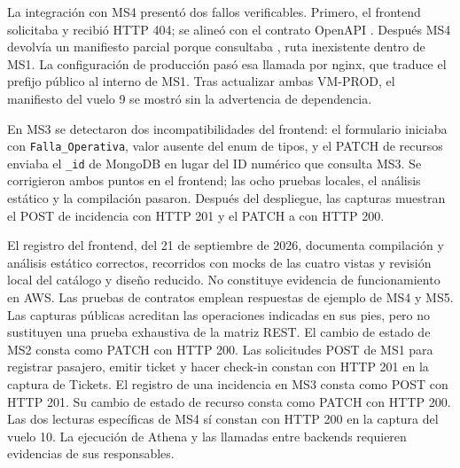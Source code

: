 La integración con MS4 presentó dos fallos verificables. Primero, el frontend
solicitaba  y recibió HTTP 404; se alineó
con el contrato OpenAPI . Después MS4 devolvía un
manifiesto parcial porque consultaba
, ruta inexistente dentro de MS1.
La configuración de producción pasó esa llamada por nginx, que traduce el
prefijo público al interno de MS1. Tras actualizar ambas VM-PROD, el
manifiesto del vuelo 9 se mostró sin la advertencia de dependencia.

En MS3 se detectaron dos incompatibilidades del frontend: el formulario
iniciaba con \texttt{Falla\_Operativa}, valor ausente del enum de tipos, y
el PATCH de recursos enviaba el \texttt{\_id} de MongoDB en lugar del ID
numérico que consulta MS3. Se corrigieron ambos puntos en el frontend;
las ocho pruebas locales, el análisis estático y la compilación pasaron.
Después del despliegue, las capturas muestran el POST de incidencia con
HTTP 201 y el PATCH a  con HTTP 200.

El registro  del frontend, del 21 de septiembre
de 2026, documenta compilación y análisis estático correctos, recorridos con
mocks de las cuatro vistas y revisión local del catálogo y diseño reducido.
No constituye evidencia de funcionamiento en AWS.
Las pruebas de contratos emplean respuestas de ejemplo de MS4 y MS5.
Las capturas públicas acreditan las operaciones indicadas en sus pies,
pero no sustituyen una prueba exhaustiva de la matriz REST.
El cambio de estado de MS2 consta como PATCH con HTTP 200. Las solicitudes
POST de MS1 para registrar pasajero,
emitir ticket y hacer check-in constan con HTTP 201 en la captura de Tickets.
El registro de una incidencia en MS3 consta como POST con HTTP 201.
Su cambio de estado de recurso consta como PATCH con HTTP 200.
Las dos lecturas específicas de MS4 sí constan con HTTP 200 en la
captura del vuelo 10. La ejecución de Athena y las llamadas entre backends
requieren evidencias de sus responsables.

